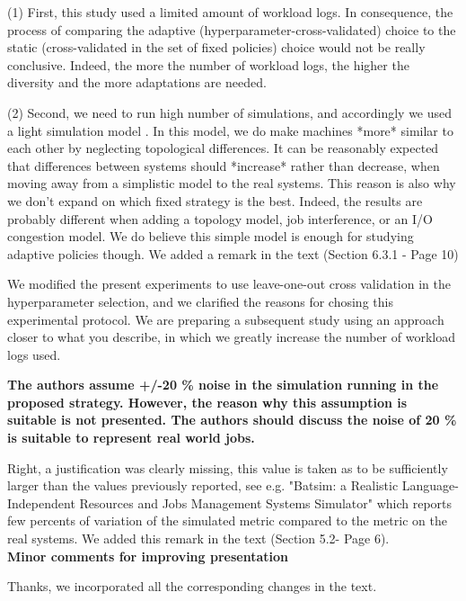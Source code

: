 \documentclass[]{article}
\begin{document}
(1) First, this study used a limited amount of workload logs. In consequence, the
process of comparing the adaptive (hyperparameter-cross-validated) choice to
the static (cross-validated in the set of fixed policies) choice would not be
really conclusive.  Indeed, the more the number of workload logs, the higher the
diversity and the more adaptations are needed.

(2) Second, we need to run high number of simulations, and accordingly we used a light simulation model . In this model, we do make
machines *more* similar to each other by neglecting topological differences. It
can be reasonably expected that differences between systems should *increase*
rather than decrease, when moving away from a simplistic model to the real
systems. This reason is also why we don't expand on which fixed strategy is 
the best. Indeed, the results are probably different when adding a topology model,
job interference, or an I/O congestion model. We do believe this simple
model is enough for studying adaptive policies though. We added a remark in 
the text (Section 6.3.1 - Page 10) 

We modified the present experiments to use leave-one-out cross
validation in the hyperparameter selection, and we clarified the reasons for
chosing this experimental protocol.
We are preparing a subsequent study using an approach closer to what you
describe, in which we greatly increase the number of workload logs used.
\medskip

\textbf{The authors assume +/-20 \% noise in the simulation running in the
proposed strategy. However, the reason why this assumption is suitable is not
presented. The authors should discuss the noise of 20 \% is suitable to represent
real world jobs.}

Right, a justification was clearly missing, this value is taken as to be
sufficiently larger than the values previously reported, see e.g. "Batsim: a
Realistic Language-Independent Resources and Jobs Management Systems Simulator"
which reports few percents of variation of the simulated metric compared to the
metric on the real systems. We added this remark in the text (Section 5.2- Page 6).\\

\textbf{Minor comments for improving presentation}

Thanks, we incorporated all the corresponding changes in the text.



\end{document}

